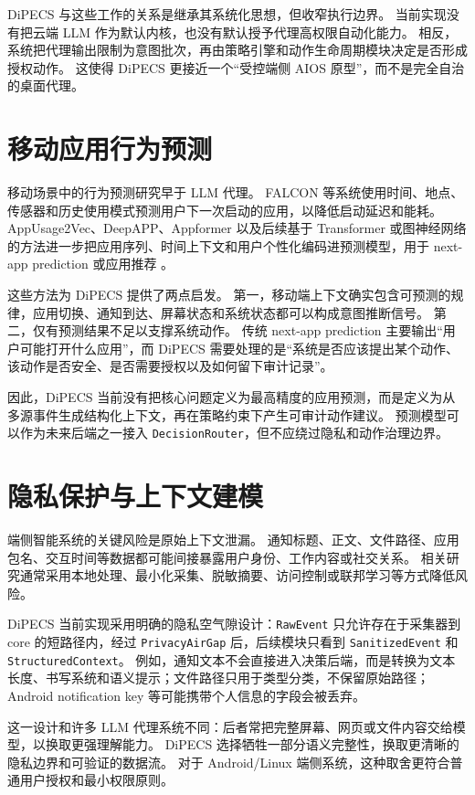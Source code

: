 \documentclass[12pt,a4paper]{article}
\begin{document}
DiPECS 与这些工作的关系是继承其系统化思想，但收窄执行边界。
当前实现没有把云端 LLM 作为默认内核，也没有默认授予代理高权限自动化能力。
相反，系统把代理输出限制为意图批次，再由策略引擎和动作生命周期模块决定是否形成授权动作。
这使得 DiPECS 更接近一个``受控端侧 AIOS 原型''，而不是完全自治的桌面代理。

\section{移动应用行为预测}\label{sec:prediction}

移动场景中的行为预测研究早于 LLM 代理。
FALCON 等系统使用时间、地点、传感器和历史使用模式预测用户下一次启动的应用，以降低启动延迟和能耗。
AppUsage2Vec、DeepAPP、Appformer 以及后续基于 Transformer 或图神经网络的方法进一步把应用序列、时间上下文和用户个性化编码进预测模型，用于 next-app prediction 或应用推荐 \cite{falcon,appusage2vec,deepapp,li2022smartphone}。

这些方法为 DiPECS 提供了两点启发。
第一，移动端上下文确实包含可预测的规律，应用切换、通知到达、屏幕状态和系统状态都可以构成意图推断信号。
第二，仅有预测结果不足以支撑系统动作。
传统 next-app prediction 主要输出``用户可能打开什么应用''，而 DiPECS 需要处理的是``系统是否应该提出某个动作、该动作是否安全、是否需要授权以及如何留下审计记录''。

因此，DiPECS 当前没有把核心问题定义为最高精度的应用预测，而是定义为从多源事件生成结构化上下文，再在策略约束下产生可审计动作建议。
预测模型可以作为未来后端之一接入 \texttt{DecisionRouter}，但不应绕过隐私和动作治理边界。

\section{隐私保护与上下文建模}\label{sec:privacy}

端侧智能系统的关键风险是原始上下文泄漏。
通知标题、正文、文件路径、应用包名、交互时间等数据都可能间接暴露用户身份、工作内容或社交关系。
相关研究通常采用本地处理、最小化采集、脱敏摘要、访问控制或联邦学习等方式降低风险。

DiPECS 当前实现采用明确的隐私空气隙设计：\texttt{RawEvent} 只允许存在于采集器到 core 的短路径内，经过 \texttt{PrivacyAirGap} 后，后续模块只看到 \texttt{SanitizedEvent} 和 \texttt{StructuredContext}。
例如，通知文本不会直接进入决策后端，而是转换为文本长度、书写系统和语义提示；文件路径只用于类型分类，不保留原始路径；Android notification key 等可能携带个人信息的字段会被丢弃。

这一设计和许多 LLM 代理系统不同：后者常把完整屏幕、网页或文件内容交给模型，以换取更强理解能力。
DiPECS 选择牺牲一部分语义完整性，换取更清晰的隐私边界和可验证的数据流。
对于 Android/Linux 端侧系统，这种取舍更符合普通用户授权和最小权限原则。
\end{document}
